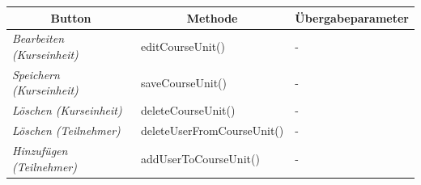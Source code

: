 \begin{itemize}
				\begin{center}
					\begin{longtable}{|p{4cm} |p{6cm} | p{4cm}|}
						
						\hline \multicolumn{1}{|c|}{\textbf{Button}} & \multicolumn{1}{|c|}{\textbf{Methode}} & \multicolumn{1}{|c|}{\textbf{\"{U}bergabeparameter}} \\ \hline
						\endfirsthead
						\hline
						\endlastfoot
						
							\textit{Bearbeiten (Kurseinheit) } & editCourseUnit() & - \\ \hline
							\textit{Speichern (Kurseinheit) } & saveCourseUnit() & - \\ \hline
							\textit{Löschen (Kurseinheit) } & deleteCourseUnit() & - \\ \hline
							\textit{Löschen (Teilnehmer) } & deleteUserFromCourseUnit() & - \\ \hline
							\textit{Hinzufügen (Teilnehmer) } & addUserToCourseUnit() & - \\ \hline
					\end{longtable}
				\end{center}
				

\end{itemize}
